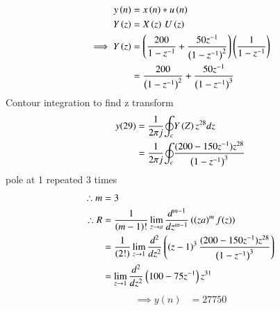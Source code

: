 \documentclass[journal,12pt,twocolumn]{IEEEtran}
\theoremstyle{remark}
\begin{document}
\begin{align}
y\left(n\right)&=x\left(n\right)*u\left(n\right)\\
Y\left(z\right)&=X\left(z\right)\,U\left(z\right)\\
\implies Y\left(z\right)&=\left(\frac{200}{1-z^{-1}}+\frac{50z^{-1}}{\left(1-
z^{-1}\right)^2}\right)\left(\frac{1}{1-z^{-1}}\right)\\
&=\frac{200}{\left(1-z^{-1}\right)^2}+\frac{50z^{-1}}{\left(1-z^{-1}\right)^3}
\end{align}
Contour integration to find z transform
\begin{align}
y(29)&=\frac{1}{2{\pi}j}{\oint_c}Y\left(Z\right)z^{28}dz\\
&=\frac{1}{2{\pi}j}{\oint_c}{\frac{(200-150z^{-1})z^{28}}{\left(1-z^{-1}\right)^{3}}}
\end{align}
pole at 1 repeated 3 times
\begin{align}
\therefore m&=3\\
\therefore R&=\frac{1}{\left(m-1\right)!}\lim_{z\to a}\frac{d^{m-1}}{dz^{m-1}}\left(\left(z
a\right)^mf{\left(z\right)}\right)\\
&=\frac{1}{\left(2!\right)}\lim_{z\to 1}\frac{d^2}{dz^2}\left(\left(z-1\right)^{3}\frac{(200-150z^{-1})z^{28}}{\left(1-z^{-1}\right)^3}\right)\\
&=\lim_{z\to1}\frac{d^2}{dz^2}\left(100-75z^{-1}\right)z^{31}
\end{align}
\begin{align}
\implies y(n)&=27750
\end{align}
\end{document}
